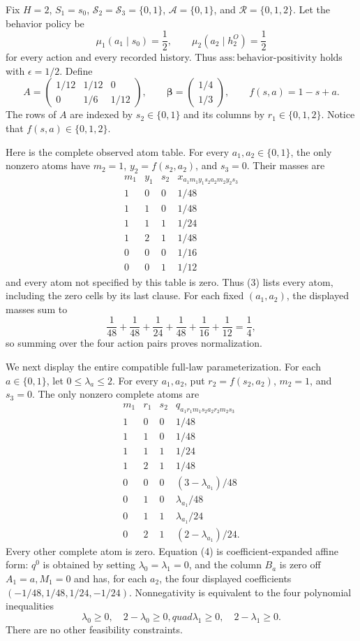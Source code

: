 Fix \(H=2\), \(S_1=s_0\), \(\mathcal S_2=\mathcal S_3=\{0,1\}\), \(\mathcal A=\{0,1\}\), and \(\mathcal R=\{0,1,2\}\). Let the behavior policy be
\[
\mu_1(a_1\mid s_0)=\frac12,
\qquad
\mu_2(a_2\mid h_2^O)=\frac12
\tag{1}
\]
for every action and every recorded history. Thus \(\mathrm{ass{:}behavior\text{-}positivity}\) holds with \(\epsilon=1/2\). Define
\[
A=\begin{pmatrix}
1/12&1/12&0\\
0&1/6&1/12
\end{pmatrix},
\qquad
\boldsymbol\beta=\begin{pmatrix}1/4\\1/3\end{pmatrix},
\qquad f(s,a)=1-s+a.
\tag{2}
\]
The rows of \(A\) are indexed by \(s_2\in\{0,1\}\) and its columns by \(r_1\in\{0,1,2\}\). Notice that \(f(s,a)\in\{0,1,2\}\).

Here is the complete observed atom table. For every \(a_1,a_2\in\{0,1\}\), the only nonzero atoms have \(m_2=1\), \(y_2=f(s_2,a_2)\), and \(s_3=0\). Their masses are
\[
\begin{array}{c|c|c|c}
m_1&y_1&s_2&x_{a_1m_1y_1s_2a_2m_2y_2s_3}\\ \hline
1&0&0&1/48\\
1&1&0&1/48\\
1&1&1&1/24\\
1&2&1&1/48\\
0&0&0&1/16\\
0&0&1&1/12
\end{array}
\tag{3}
\]
and every atom not specified by this table is zero. Thus (3) lists every atom, including the zero cells by its last clause. For each fixed \((a_1,a_2)\), the displayed masses sum to
\[
\frac1{48}+\frac1{48}+\frac1{24}+\frac1{48}
+\frac1{16}+\frac1{12}=\frac14,
\]
so summing over the four action pairs proves normalization.

We next display the entire compatible full-law parameterization. For each \(a\in\{0,1\}\), let \(0\leq\lambda_a\leq2\). For every \(a_1,a_2\), put \(r_2=f(s_2,a_2)\), \(m_2=1\), and \(s_3=0\). The only nonzero complete atoms are
\[
\begin{array}{c|c|c|c}
m_1&r_1&s_2&q_{a_1r_1m_1s_2a_2r_2m_2s_3}\\ \hline
1&0&0&1/48\\
1&1&0&1/48\\
1&1&1&1/24\\
1&2&1&1/48\\
0&0&0&(3-\lambda_{a_1})/48\\
0&1&0&\lambda_{a_1}/48\\
0&1&1&\lambda_{a_1}/24\\
0&2&1&(2-\lambda_{a_1})/24.
\end{array}
\tag{4}
\]
Every other complete atom is zero. Equation (4) is coefficient-expanded affine form: \(q^0\) is obtained by setting \(\lambda_0=\lambda_1=0\), and the column \(B_a\) is zero off \(A_1=a,M_1=0\) and has, for each \(a_2\), the four displayed coefficients \((-1/48,1/48,1/24,-1/24)\). Nonnegativity is equivalent to the four polynomial inequalities
\[
\lambda_0\geq0,\quad2-\lambda_0\geq0,quad
\lambda_1\geq0,\quad2-\lambda_1\geq0.
\tag{5}
\]
There are no other feasibility constraints.

